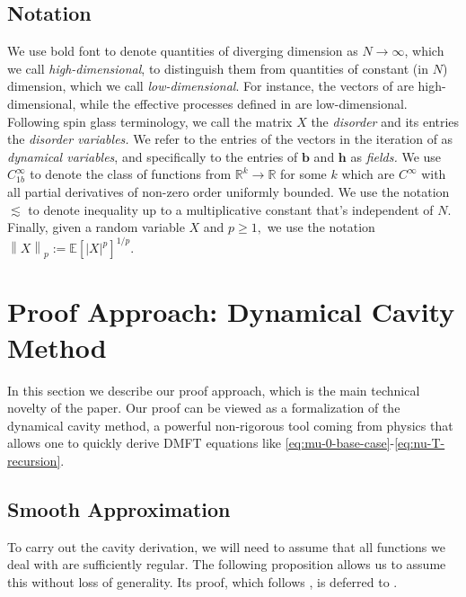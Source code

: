 \documentclass{article}
\newcommand{\1}{\mathbbm{1}}
\newcommand{\norm}[1]{\left\lVert#1\right\rVert}
\theoremstyle{plain}
\theoremstyle{definition}
\theoremstyle{remark}
\newcommand{\E}{\mathbb{E}}
\newcommand{\bfh}{\boldsymbol{h}}
\newcommand{\bfb}{\boldsymbol{b}}
\newcommand{\R}{\mathbb{R}}
\begin{document}
\subsection{Notation}

We use bold font to denote quantities of diverging dimension as $N\to\infty$, which we call \emph{high-dimensional}, to distinguish them from quantities of constant (in $N$) dimension, which we call \emph{low-dimensional}. For instance, the vectors of  are high-dimensional, while the effective processes defined in  are low-dimensional. Following spin glass terminology, we call the matrix $X$ the \emph{disorder} and its entries the \emph{disorder variables.} We refer to the entries of the vectors in the iteration of  as \emph{dynamical variables}, and specifically to the entries of $\bfb$ and $\bfh$ as \emph{fields.} We use $C^{\infty}_{1b}$ to denote the class of functions from $\R^k\to \R$ for some $k$ which are $C^\infty$ with all partial derivatives of non-zero order uniformly bounded. We use the notation $\lesssim$ to denote inequality up to a multiplicative constant that's independent of $N$. Finally, given a random variable $X$ and $p\geq 1,$ we use the notation $\norm{X}_p := \E[|X|^p]^{1/p}.$


\section{Proof Approach: Dynamical Cavity Method}
In this section we describe our proof approach, which is the main technical novelty of the paper. Our proof can be viewed as a formalization of the dynamical cavity method, a powerful non-rigorous tool coming from physics that allows one to quickly derive DMFT equations like \eqref{eq:mu-0-base-case}-\eqref{eq:nu-T-recursion}.


\subsection{Smooth Approximation}
To carry out the cavity derivation, we will need to assume that all functions we deal with are sufficiently regular. The following proposition allows us to assume this without loss of generality. Its proof, which follows \cite[Proposition 4.1]{wei-kwo-universality}, is deferred to .
\end{document}
